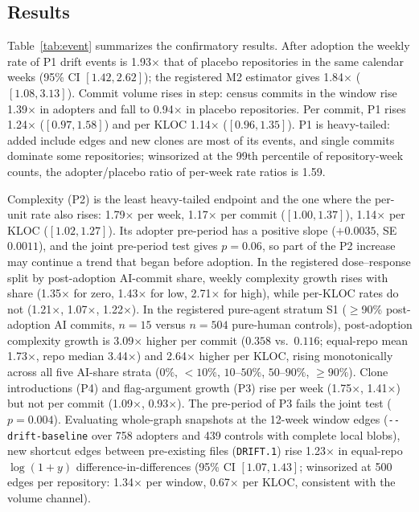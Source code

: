 \documentclass[sigplan,11pt,nonacm=true]{acmart}
\newcommand{\x}{$\times$}
\begin{document}
\subsection{Results}

Table~\ref{tab:event} summarizes the confirmatory results. After adoption the
weekly rate of P1 drift events is 1.93\x{} that of placebo repositories in the
same calendar weeks (95\% CI $[1.42, 2.62]$); the registered M2 estimator
gives 1.84\x{} ($[1.08, 3.13]$). Commit volume rises in step: census commits
in the window rise 1.39\x{} in adopters and fall to 0.94\x{} in placebo
repositories. Per commit, P1 rises 1.24\x{} ($[0.97, 1.58]$) and per KLOC
1.14\x{} ($[0.96, 1.35]$). P1 is heavy-tailed: added include edges and new
clones are most of its events, and single commits dominate some repositories;
winsorized at the 99th percentile of repository-week counts, the adopter/placebo
ratio of per-week rate ratios is 1.59.

Complexity (P2) is the least heavy-tailed endpoint and the one where the
per-unit rate also rises: 1.79\x{} per week, 1.17\x{} per commit
($[1.00, 1.37]$), 1.14\x{} per KLOC ($[1.02, 1.27]$). Its adopter pre-period
has a positive slope ($+0.0035$, SE $0.0011$), and the joint pre-period test
gives $p=0.06$, so part of the P2 increase may continue a trend that began
before adoption. In the registered dose--response split by post-adoption
AI-commit share, weekly complexity growth rises with share (1.35\x{} for zero,
1.43\x{} for low, 2.71\x{} for high), while per-KLOC rates do not (1.21\x{},
1.07\x{}, 1.22\x{}). In the registered pure-agent stratum S1 ($\ge$90\%
post-adoption AI commits, $n=15$ versus $n=504$ pure-human controls),
post-adoption complexity growth is 3.09\x{} higher per commit ($0.358$ vs.\
$0.116$; equal-repo mean 1.73\x{}, repo median 3.44\x{}) and 2.64\x{} higher
per KLOC, rising monotonically across all five AI-share strata ($0\%$,
$<10\%$, $10\text{--}50\%$, $50\text{--}90\%$, $\ge90\%$). Clone introductions (P4) and flag-argument growth (P3)
rise per week (1.75\x{}, 1.41\x{}) but not per commit (1.09\x{}, 0.93\x{}). The
pre-period of P3 fails the joint test ($p=0.004$). Evaluating whole-graph
snapshots at the 12-week window edges (\texttt{-\/-drift-baseline} over 758
adopters and 439 controls with complete local blobs), new shortcut edges
between pre-existing files (\texttt{DRIFT.1}) rise 1.23\x{} in equal-repo
$\log(1+y)$ difference-in-differences (95\% CI $[1.07, 1.43]$; winsorized at
500 edges per repository: 1.34\x{} per window, 0.67\x{} per KLOC, consistent
with the volume channel).
\end{document}
